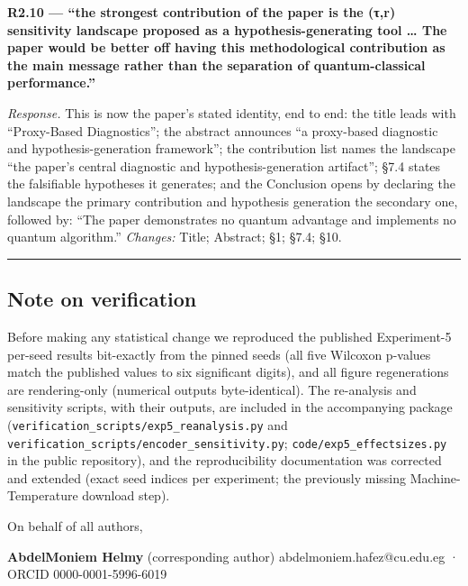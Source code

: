\documentclass[
  11pt,
]{article}
\begin{document}
\textbf{R2.10 --- ``the strongest contribution of the paper is the (τ,r)
sensitivity landscape proposed as a hypothesis-generating tool \ldots{}
The paper would be better off having this methodological contribution as
the main message rather than the separation of quantum-classical
performance.''}

\emph{Response.} This is now the paper's stated identity, end to end:
the title leads with ``Proxy-Based Diagnostics''; the abstract announces
``a proxy-based diagnostic and hypothesis-generation framework''; the
contribution list names the landscape ``the paper's central diagnostic
and hypothesis-generation artifact''; §7.4 states the falsifiable
hypotheses it generates; and the Conclusion opens by declaring the
landscape the primary contribution and hypothesis generation the
secondary one, followed by: ``The paper demonstrates no quantum
advantage and implements no quantum algorithm.'' \emph{Changes:} Title;
Abstract; §1; §7.4; §10.

\begin{center}\rule{0.5\linewidth}{0.5pt}\end{center}

\subsection{Note on verification}\label{note-on-verification}

Before making any statistical change we reproduced the published
Experiment-5 per-seed results bit-exactly from the pinned seeds (all
five Wilcoxon p-values match the published values to six significant
digits), and all figure regenerations are rendering-only (numerical
outputs byte-identical). The re-analysis and sensitivity scripts, with
their outputs, are included in the accompanying package
(\texttt{verification\_scripts/exp5\_reanalysis.py} and
\texttt{verification\_scripts/encoder\_sensitivity.py};
\texttt{code/exp5\_effectsizes.py} in the public repository), and the
reproducibility documentation was corrected and extended (exact seed
indices per experiment; the previously missing Machine-Temperature
download step).

On behalf of all authors,

\textbf{AbdelMoniem Helmy} (corresponding author)
abdelmoniem.hafez@cu.edu.eg · ORCID 0000-0001-5996-6019
\end{document}
